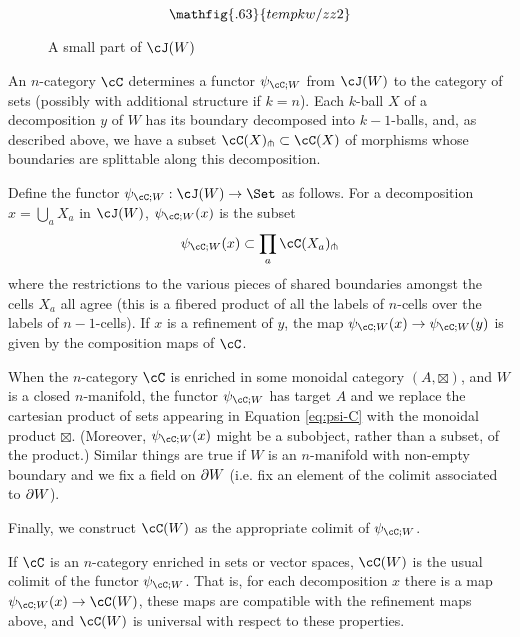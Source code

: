 \begin{figure}[!ht]
\begin{equation*}
\mathfig{.63}{tempkw/zz2}
\end{equation*}
\caption{A small part of $\cJ(W)$}
\label{partofJfig}
\end{figure}



An $n$-category $\cC$ determines 
a functor $\psi_{\cC;W}$ from $\cJ(W)$ to the category of sets 
(possibly with additional structure if $k=n$).
Each $k$-ball $X$ of a decomposition $y$ of $W$ has its boundary decomposed into $k{-}1$-balls,
and, as described above, we have a subset $\cC(X)\spl \sub \cC(X)$ of morphisms whose boundaries
are splittable along this decomposition.

\begin{defn}
Define the functor $\psi_{\cC;W} : \cJ(W) \to \Set$ as follows.
For a decomposition $x = \bigcup_a X_a$ in $\cJ(W)$, $\psi_{\cC;W}(x)$ is the subset
\begin{equation}
\label{eq:psi-C}
	\psi_{\cC;W}(x) \sub \prod_a \cC(X_a)\spl
\end{equation}
where the restrictions to the various pieces of shared boundaries amongst the cells
$X_a$ all agree (this is a fibered product of all the labels of $n$-cells over the labels of $n-1$-cells).
If $x$ is a refinement of $y$, the map $\psi_{\cC;W}(x) \to \psi_{\cC;W}(y)$ is given by the composition maps of $\cC$.
\end{defn}

When the $n$-category $\cC$ is enriched in some monoidal category $(A,\boxtimes)$, and $W$ is a
closed $n$-manifold, the functor $\psi_{\cC;W}$ has target $A$ and
we replace the cartesian product of sets appearing in Equation \eqref{eq:psi-C} with the monoidal product $\boxtimes$. (Moreover, $\psi_{\cC;W}(x)$ might be a subobject, rather than a subset, of the product.)
Similar things are true if $W$ is an $n$-manifold with non-empty boundary and we
fix a field on $\partial W$
(i.e. fix an element of the colimit associated to $\partial W$).

Finally, we construct $\cC(W)$ as the appropriate colimit of $\psi_{\cC;W}$.

\begin{defn}
If $\cC$ is an $n$-category enriched in sets or vector spaces, $\cC(W)$ is the usual colimit of the functor $\psi_{\cC;W}$.
That is, for each decomposition $x$ there is a map
$\psi_{\cC;W}(x)\to \cC(W)$, these maps are compatible with the refinement maps
above, and $\cC(W)$ is universal with respect to these properties.
\end{defn}

